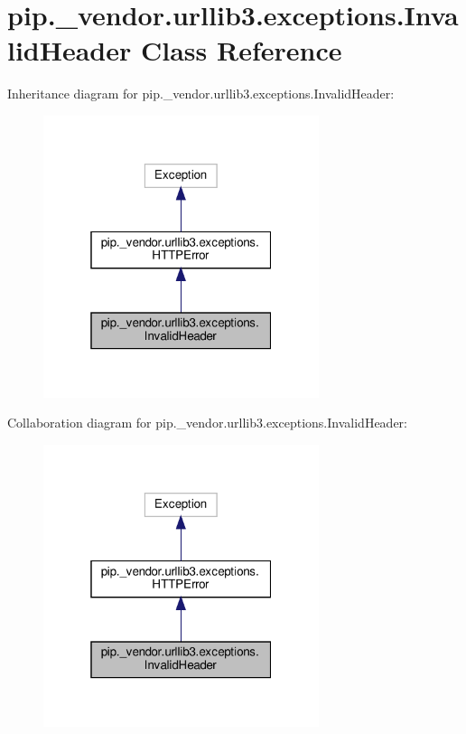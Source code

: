 \hypertarget{classpip_1_1__vendor_1_1urllib3_1_1exceptions_1_1InvalidHeader}{}\section{pip.\+\_\+vendor.\+urllib3.\+exceptions.\+Invalid\+Header Class Reference}
\label{classpip_1_1__vendor_1_1urllib3_1_1exceptions_1_1InvalidHeader}


Inheritance diagram for pip.\+\_\+vendor.\+urllib3.\+exceptions.\+Invalid\+Header\+:
\nopagebreak
\begin{figure}[H]
\begin{center}
\leavevmode
\includegraphics[width=229pt]{classpip_1_1__vendor_1_1urllib3_1_1exceptions_1_1InvalidHeader__inherit__graph}
\end{center}
\end{figure}


Collaboration diagram for pip.\+\_\+vendor.\+urllib3.\+exceptions.\+Invalid\+Header\+:
\nopagebreak
\begin{figure}[H]
\begin{center}
\leavevmode
\includegraphics[width=229pt]{classpip_1_1__vendor_1_1urllib3_1_1exceptions_1_1InvalidHeader__coll__graph}
\end{center}
\end{figure}


